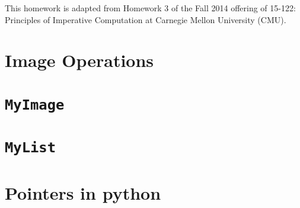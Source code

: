 \documentclass[addpoints]{exam}
\begin{document}
This homework is adapted from Homework 3 of the Fall 2014 offering of 15-122: Principles of Imperative Computation at Carnegie Mellon University (CMU).

\newpage
\appendix
\section{Image Operations}


\newpage
\section{\texttt{MyImage}}


\newpage
\section{\texttt{MyList}}


\newpage
\section{Pointers in python}




\end{document}
